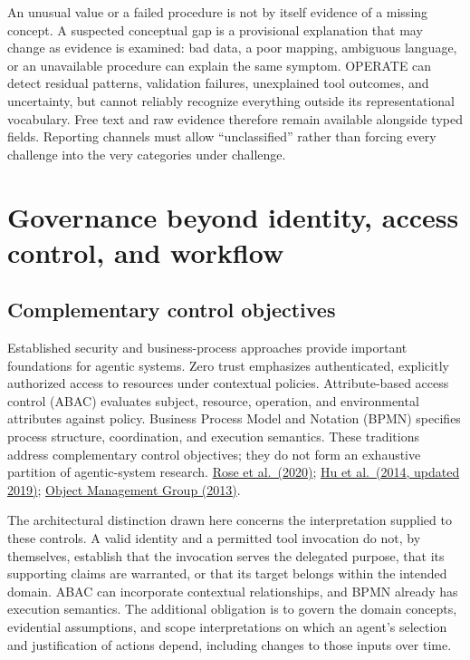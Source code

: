 \documentclass[preprint,12pt,authoryear]{elsarticle}
\begin{document}
An unusual value or a failed procedure is not by itself evidence of a
missing concept. A suspected conceptual gap is a provisional explanation
that may change as evidence is examined: bad data, a poor mapping,
ambiguous language, or an unavailable procedure can explain the same
symptom. OPERATE can detect residual patterns, validation failures,
unexplained tool outcomes, and uncertainty, but cannot reliably
recognize everything outside its representational vocabulary. Free text
and raw evidence therefore remain available alongside typed fields.
Reporting channels must allow ``unclassified'' rather than forcing every
challenge into the very categories under challenge.

\section{Governance beyond identity, access control, and
workflow}\label{governance-beyond-identity-access-control-and-workflow}

\subsection{Complementary control
objectives}\label{complementary-control-objectives}

Established security and business-process approaches provide important
foundations for agentic systems. Zero trust emphasizes authenticated,
explicitly authorized access to resources under contextual policies.
Attribute-based access control (ABAC) evaluates subject, resource,
operation, and environmental attributes against policy. Business Process
Model and Notation (BPMN) specifies process structure, coordination, and
execution semantics. These traditions address complementary control
objectives; they do not form an exhaustive partition of agentic-system
research. \href{https://doi.org/10.6028/NIST.SP.800-207}{Rose et
al.~(2020)}; \href{https://doi.org/10.6028/NIST.SP.800-162}{Hu et
al.~(2014, updated 2019)};
\href{https://www.omg.org/spec/BPMN/2.0.2/PDF}{Object Management Group
(2013)}.

The architectural distinction drawn here concerns the interpretation
supplied to these controls. A valid identity and a permitted tool
invocation do not, by themselves, establish that the invocation serves
the delegated purpose, that its supporting claims are warranted, or that
its target belongs within the intended domain. ABAC can incorporate
contextual relationships, and BPMN already has execution semantics. The
additional obligation is to govern the domain concepts, evidential
assumptions, and scope interpretations on which an agent's selection and
justification of actions depend, including changes to those inputs over
time.
\end{document}
